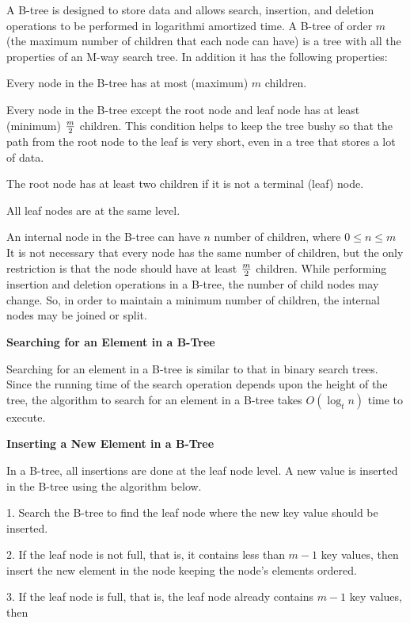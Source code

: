 A B-tree is designed to store data and allows search, insertion, and deletion operations to be performed in logarithmi amortized time. A B-tree of order $m$ (the maximum number of children that each node can have) is a tree with all the properties of an M-way search tree. In addition it has the following properties:

\vskip 1mm
 Every node in the B-tree has at most (maximum) $m$ children.

\vskip 3mm
 Every node in the B-tree except the root node and leaf node has at least (minimum) ${m\over 2}$ children. This condition helps to keep the tree bushy so that the path from the root node to the leaf is very short, even in a tree that stores a lot of data.

\vskip 3mm
 The root node has at least two children if it is not a terminal (leaf) node.

\vskip 3mm
 All leaf nodes are at the same level.

\vskip 1mm
An internal node in the B-tree can have $n$ number of children, where $0\leq n \leq m$ It is not necessary that every node has the same number of children, but the only restriction is that the node should have at least ${m\over 2}$ children. While performing insertion and deletion operations in a B-tree, the number of child nodes may change. So, in order to maintain a minimum number of children, the internal nodes may be joined or split.

\filbreak
\vskip 1cm
{\bf Searching for an Element in a B-Tree}

\vskip 1mm
Searching for an element in a B-tree is similar to that in binary search trees. Since the running time of the search operation depends upon the height of the tree, the algorithm to search for an element in a B-tree takes $O(\log_t n)$ time to execute.

\filbreak
\vskip 1cm
{\bf Inserting a New Element in a B-Tree}

\vskip 1mm
In a B-tree, all insertions are done at the leaf node level. A new value is inserted in the B-tree using the algorithm below.

\vskip 1mm
1. Search the B-tree to find the leaf node where the new key value should be inserted.

\vskip 3mm
2. If the leaf node is not full, that is, it contains less than $m-1$ key values, then insert the new element in the node keeping the node's elements ordered.

\vskip 3mm
3. If the leaf node is full, that is, the leaf node already contains $m-1$ key values, then

